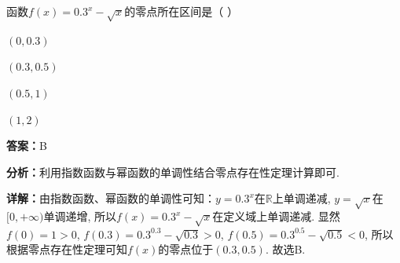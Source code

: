\begin{question}[points=5]
函数$f(x) = 0.3^x - \sqrt{x}$的零点所在区间是（   ）
\begin{choices}
  \item $(0, 0.3)$
  \item $(0.3, 0.5)$
  \item $(0.5, 1)$
  \item $(1, 2)$
\end{choices}
\begin{solution}
\textbf{答案：}B

\textbf{分析：}利用指数函数与幂函数的单调性结合零点存在性定理计算即可.

\textbf{详解：}由指数函数、幂函数的单调性可知：$y = 0.3^x$在$\mathbb{R}$上单调递减, $y = \sqrt{x}$在$[0, +\infty)$单调递增, 所以$f(x) = 0.3^x - \sqrt{x}$在定义域上单调递减. 显然$f(0) = 1 > 0$, $f(0.3) = 0.3^{0.3} - \sqrt{0.3} > 0$, $f(0.5) = 0.3^{0.5} - \sqrt{0.5} < 0$, 所以根据零点存在性定理可知$f(x)$的零点位于$(0.3, 0.5)$. 故选B.
\end{solution}
\end{question}

